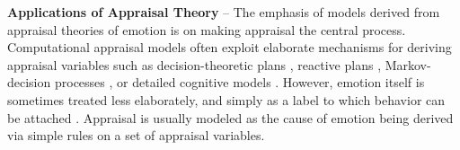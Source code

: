 \documentclass[12pt]{report}
\begin{document}
\textbf{Applications of Appraisal Theory} -- The emphasis of models derived from
appraisal theories of emotion is on making appraisal the central process.
Computational appraisal models often exploit elaborate mechanisms for deriving
appraisal variables such as decision-theoretic plans
\cite{gratch:domain-independent} \cite{marsella:ema-process-model}, reactive
plans \cite{rank:appraisal-story-world} \cite{neal:modeling-antecedents}
\cite{staller:emotion-social-norm}, Markov-decision processes
\cite{elnasr:flame} \cite{si:modeling-appraisal-tom-journal}, or detailed
cognitive models \cite{marinier:behavior-emotion}. However, emotion itself is
sometimes treated less elaborately, and simply as a label to which behavior can
be attached \cite{elliott:affective-reasoner}. Appraisal is usually modeled as
the cause of emotion being derived via simple rules on a set of appraisal
variables.
\end{document}
